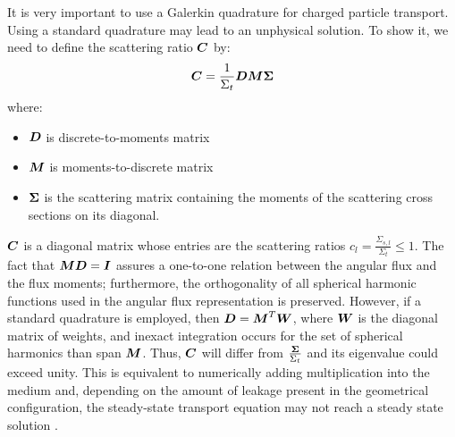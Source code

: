 It is very important to use a Galerkin quadrature for charged particle
transport. Using a standard quadrature may lead to an unphysical solution. To
show it, we need to define the scattering ratio $\boldsymbol{C}$ by:
\begin{equation}
\boldsymbol{C} = \frac{1}{\Sigma_t}\boldsymbol{D}\boldsymbol{M}\boldsymbol{\Sigma}
\end{equation}
where:
\begin{itemize}
\item $\boldsymbol{D}$ is discrete-to-moments matrix
\item $\boldsymbol{M}$ is moments-to-discrete matrix
\item $\boldsymbol{\Sigma}$ is the scattering matrix containing the moments of the
  scattering cross sections on its diagonal.
\end{itemize}
$\boldsymbol{C}$ is a diagonal matrix whose entries are the scattering ratios
$c_l=\frac{\Sigma_{s,l}}{\Sigma_t} \leq 1$. The fact that $\boldsymbol{MD}=\boldsymbol{I}$
assures a one-to-one relation between the angular flux and the flux moments;
furthermore, the orthogonality of all spherical harmonic functions used in the
angular flux representation is preserved. However, if a standard quadrature is
employed, then $\boldsymbol{D} = \boldsymbol{M}^T \boldsymbol{W}$, where $\boldsymbol{W}$ is the diagonal
matrix of weights, and inexact integration occurs for the set of spherical
harmonics than span $\boldsymbol{M}$. Thus, $\boldsymbol{C}$ will differ from
$\frac{\boldsymbol{\Sigma}}{\Sigma_t}$ and its eigenvalue could exceed unity. This is
equivalent to numerically adding multiplication into the medium and, depending
on the amount of leakage present in the geometrical configuration, the
steady-state transport equation may not reach a steady state solution
\cite{pautz_fp}.

